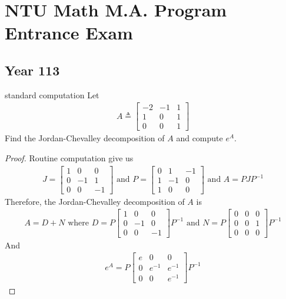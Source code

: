 \documentclass{report}
\begin{document}
\chapter{NTU Math M.A. Program Entrance Exam} 
\section{Year 113}
\begin{question}{standard computation}{}
Let 
\begin{align*}
A\triangleq  \begin{bmatrix}
  -2 & -1 & 1\\
  1 & 0 & 1\\
  0 & 0 & 1
\end{bmatrix}
\end{align*}
Find the Jordan-Chevalley decomposition of $A$ and compute  $e^A$. 
\end{question}
\begin{proof}
Routine computation give us 
\begin{align*}
J=\begin{bmatrix}
  1 & 0 & 0 \\
  0 & -1 & 1\\
  0 & 0 & -1
\end{bmatrix}\text{ and }P=\begin{bmatrix}
  0 & 1 & -1 \\
  1 & -1 & 0 \\
  1 & 0 & 0
\end{bmatrix}\text{ and }A=PJP^{-1}
\end{align*}
Therefore, the Jordan-Chevalley decomposition of $A$ is 
\begin{align*}
A= D+ N \text{ where }D=P\begin{bmatrix}
  1 & 0 & 0 \\
  0 & -1 & 0 \\
  0 & 0 & -1 
\end{bmatrix}P^{-1}\text{ and }N=P\begin{bmatrix}
0 & 0 & 0 \\
0 & 0 & 1 \\
0 & 0 & 0
\end{bmatrix}P ^{-1}
\end{align*}
And 
\begin{align*}
e^A= P\begin{bmatrix}
  e & 0 & 0\\
  0 & e^{-1} & e^{-1} \\
  0 & 0 & e^{-1}
\end{bmatrix} P^{-1}
\end{align*}
\end{proof}
\end{document}
